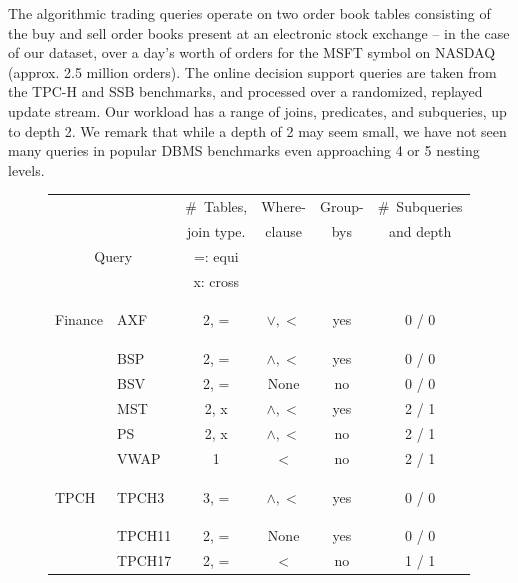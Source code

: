 The algorithmic trading queries operate on two order book tables consisting of
the buy and sell order books present at an electronic stock exchange -- in the
case of our dataset, over a day's worth of orders for the MSFT symbol on NASDAQ
(approx. 2.5 million orders). The online decision support queries are taken from
the TPC-H and SSB benchmarks, and processed over a randomized, replayed update
stream. 
Our workload has a range of joins, predicates, and subqueries, up to depth 2. We
remark that while a depth of 2 may seem small, we have not seen many queries in
popular DBMS benchmarks even approaching 4 or 5 nesting levels.

\begin{figure}[t]
\scriptsize{
\begin{center}
\begin{tabular}{ p{0.15cm} | l | c | c | c  | c }
\multicolumn{2}{c|}{}      & \#~Tables,  & Where- & Group- & \#~Subqueries\\
\multicolumn{2}{c|}{}      & join type.  & clause & bys    & and depth\\
\multicolumn{2}{c|}{Query} & =: equi     &        &        & \\
\multicolumn{2}{c|}{}      & x: cross    &        &        & \\
\hline
\begin{rotate}{90}\hspace{-1.1cm}Finance\end{rotate}
& AXF        & 2, =      & $\vee, <$     & yes & 0 / 0 \\
& BSP        & 2, =      & $\wedge, <$   & yes & 0 / 0 \\
& BSV        & 2, =      & None          & no  & 0 / 0 \\
& MST        & 2, x      & $\wedge, <$   & yes & 2 / 1 \\
& PS         & 2, x      & $\wedge, <$   & no  & 2 / 1 \\
& VWAP       & 1         & $<$           & no  & 2 / 1 \\
\hline
\begin{rotate}{90}\hspace{-1.1cm}TPCH\end{rotate}
& TPCH3      & 3, =      & $\wedge, <$   & yes & 0 / 0 \\
& TPCH11     & 2, =      & None          & yes & 0 / 0 \\
& TPCH17     & 2, =      & $<$           & no  & 1 / 1 \\

\end{tabular}
\end{center}}
\end{figure}
